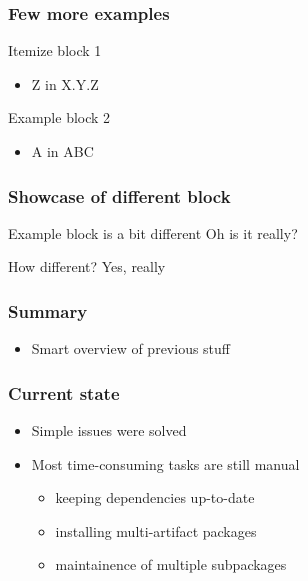 \documentclass[pdftex,unicode,xcolor=table]{beamer}
\begin{document}
\begin{frame}
  \frametitle{Few more examples}
  \begin{block}{Itemize block 1}
    \begin{itemize}
    \item Z in X.Y.Z
    \end{itemize}
  \end{block}

  \begin{block}{Example block 2}
    \begin{itemize}
    \item A in ABC
    \end{itemize}
  \end{block}
\end{frame}

\begin{frame}
  \frametitle{Showcase of different block}
  \begin{exampleblock}{Example block is a bit different}
    Oh is it really?
  \end{exampleblock}

  \begin{block}{How different?}
    Yes, really
  \end{block}
\end{frame}


\begin{frame}
  \frametitle{Summary}
  \begin{itemize}
    \item Smart overview of previous stuff
  \end{itemize}
\end{frame}




\begin{frame}
  \frametitle{Current state}
  \begin{itemize}
    \item Simple issues were solved
    \item Most time-consuming tasks are still manual
    \begin{itemize}
      \item keeping dependencies up-to-date
      \item installing multi-artifact packages
      \item maintainence of multiple subpackages
    \end{itemize}
  \end{itemize}
\end{frame}
\end{document}
